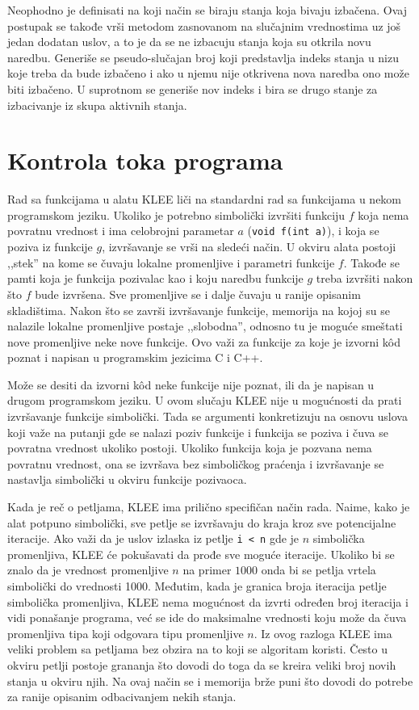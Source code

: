 \documentclass[12pt,oneside]{memoir}
\begin{document}
Neophodno je definisati na koji način se biraju stanja koja bivaju izbačena. Ovaj postupak se takođe vrši metodom zasnovanom na slučajnim vrednostima uz još jedan dodatan uslov, a to je da se ne izbacuju stanja koja su otkrila novu naredbu. Generiše se pseudo-slučajan broj koji predstavlja indeks stanja u nizu koje treba da bude izbačeno i ako u njemu nije otkrivena nova naredba ono može biti izbačeno. U suprotnom se generiše nov indeks i bira se drugo stanje za izbacivanje iz skupa aktivnih stanja.

\section{Kontrola toka programa}
Rad sa funkcijama u alatu KLEE liči na standardni rad sa funkcijama u nekom programskom jeziku. Ukoliko je potrebno simbolički izvršiti funkciju $f$ koja nema povratnu vrednost i ima celobrojni parametar $a$ (\texttt{void f(int a)}), i koja se poziva iz funkcije $g$, izvršavanje se vrši na sledeći način. U okviru alata postoji ,,stek'' na kome se čuvaju lokalne promenljive i parametri funkcije $f$. Takođe se pamti koja je funkcija pozivalac kao i koju naredbu funkcije $g$ treba izvršiti nakon što $f$ bude izvršena. Sve promenljive se i dalje čuvaju u ranije opisanim skladištima. Nakon što se završi izvršavanje funkcije, memorija na kojoj su se nalazile lokalne promenljive postaje ,,slobodna'', odnosno tu je moguće smeštati nove promenljive neke nove funkcije. Ovo važi za funkcije za koje je izvorni k\^od poznat i napisan u programskim jezicima C i C++. 

Može se desiti da izvorni k\^od neke funkcije nije poznat, ili da je napisan u drugom programskom jeziku. U ovom slučaju KLEE nije u mogućnosti da prati izvršavanje funkcije simbolički. Tada se argumenti konkretizuju na osnovu uslova koji važe na putanji gde se nalazi poziv funkcije i funkcija se poziva i čuva se povratna vrednost ukoliko postoji. Ukoliko funkcija koja je pozvana nema povratnu vrednost, ona se izvršava bez simboličkog praćenja i izvršavanje se nastavlja simbolički u okviru funkcije pozivaoca. 

\indent Kada je reč o petljama, KLEE ima prilično specifičan način rada. Naime, kako je alat potpuno simbolički, sve petlje se izvršavaju do kraja kroz sve potencijalne iteracije. Ako važi da je uslov izlaska iz petlje \texttt{i < n} gde je $n$ simbolička promenljiva, KLEE će pokušavati da prođe sve moguće iteracije. Ukoliko bi se znalo da je vrednost promenljive $n$ na primer $1000$ onda bi se petlja vrtela simbolički do vrednosti 1000. Međutim, kada je granica broja iteracija petlje simbolička promenljiva, KLEE nema mogućnost da izvrti određen broj iteracija i vidi ponašanje programa, već se ide do maksimalne vrednosti koju može da čuva promenljiva tipa koji odgovara tipu promenljive $n$. Iz ovog razloga KLEE ima veliki problem sa petljama bez obzira na to koji se algoritam koristi. Često u okviru petlji postoje grananja što dovodi do toga da se kreira veliki broj novih stanja u okviru njih. Na ovaj način se i memorija brže puni što dovodi do potrebe za ranije opisanim odbacivanjem nekih stanja. 
\end{document}
